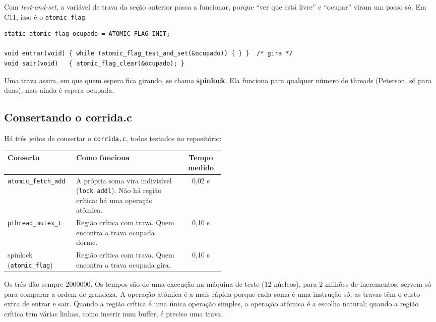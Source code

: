 \documentclass[11pt,a4paper]{article}
\newcommand{\raiz}{../../../..}
\newcommand{\cmd}[1]{\texttt{#1}}
\begin{document}
Com \emph{test-and-set}, a variável de trava da seção anterior passa a funcionar, porque ``ver que está livre'' e ``ocupar'' viram um passo só. Em C11, isso é o \cmd{atomic\_flag}:

\begin{lstlisting}[style=codigo]
static atomic_flag ocupado = ATOMIC_FLAG_INIT;

void entrar(void) { while (atomic_flag_test_and_set(&ocupado)) { } }  /* gira */
void sair(void)   { atomic_flag_clear(&ocupado); }
\end{lstlisting}

Uma trava assim, em que quem espera fica girando, se chama \textbf{spinlock}. Ela funciona para qualquer número de threads (Peterson, só para duas), mas ainda é espera ocupada.

\subsection{Consertando o corrida.c}

Há três jeitos de consertar o \cmd{corrida.c}, todos testados no repositório:

\begin{center}
\begin{tabular}{@{}lR{0.5\linewidth}c@{}}
\toprule
\textbf{Conserto} & \textbf{Como funciona} & \textbf{Tempo medido} \\
\midrule
\cmd{atomic\_fetch\_add} & A própria soma vira indivisível (\cmd{lock addl}). Não há região crítica: há uma operação atômica. & 0{,}02 s \\
\cmd{pthread\_mutex\_t} & Região crítica com trava. Quem encontra a trava ocupada dorme. & 0{,}10 s \\
spinlock (\cmd{atomic\_flag}) & Região crítica com trava. Quem encontra a trava ocupada gira. & 0{,}10 s \\
\bottomrule
\end{tabular}
\end{center}

Os três dão sempre 2000000. Os tempos são de uma execução na máquina de teste (12 núcleos), para 2 milhões de incrementos; servem só para comparar a ordem de grandeza. A operação atômica é a mais rápida porque cada soma é uma instrução só; as travas têm o custo extra de entrar e sair. Quando a região crítica é uma única operação simples, a operação atômica é a escolha natural; quando a região crítica tem várias linhas, como inserir num buffer, é preciso uma trava.


\end{document}
